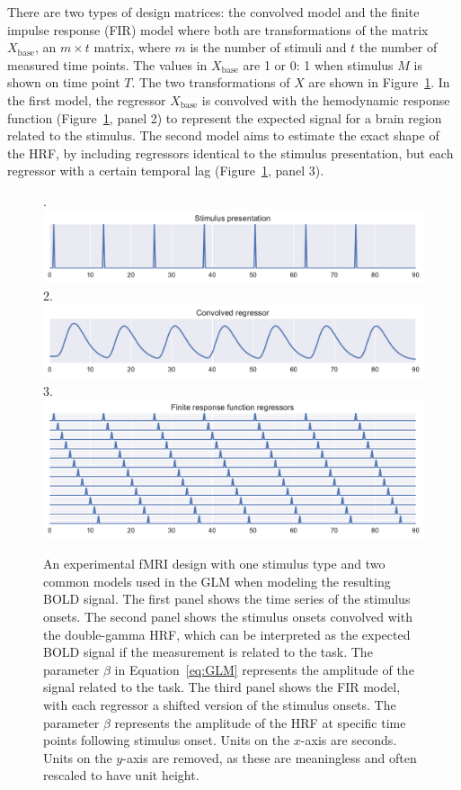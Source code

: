 \documentclass[article]{jss}
\begin{document}
There are two types of design matrices: the convolved model and the
finite impulse response (FIR) model where both are transformations of
the matrix $X_\text{base}$, an $m \times t$ matrix, where $m$ is the
number of stimuli and $t$ the number of measured time points.  The
values in $X_\text{base}$ are 1 or 0: 1 when stimulus $M$ is shown on
time point $T$.  The two transformations of $X$ are shown in
Figure~\ref{fig1}.  In the first model, the regressor $X_\text{base}$
is convolved with the hemodynamic response function (Figure~\ref{fig1},
panel 2) to represent the expected signal for a brain region related
to the stimulus.  The second model aims to estimate the exact shape of
the HRF, by including regressors identical to the stimulus
presentation, but each regressor with a certain temporal lag
(Figure~\ref{fig1}, panel 3).
%
\begin{figure}[t!]
. \\
\includegraphics[scale=2]{Figure1a.pdf} \\
2. \\
\includegraphics[scale=2]{Figure1b.pdf} \\
3. \\
\includegraphics[scale=2]{Figure1c.pdf}
\caption{An experimental fMRI design with one stimulus type and two
  common models used in the GLM when modeling the resulting BOLD
  signal.  The first panel shows the time series of the stimulus
  onsets.  The second panel shows the stimulus onsets convolved with
  the double-gamma HRF, which can be interpreted as the expected BOLD
  signal if the measurement is related to the task.  The parameter
  $\beta$ in Equation~\ref{eq:GLM} represents the amplitude of the
  signal related to the task. The third panel shows the FIR model,
  with each regressor a shifted version of the stimulus onsets.  The
  parameter $\beta$ represents the amplitude of the HRF at specific
  time points following stimulus onset.  Units on the $x$-axis are
  seconds.  Units on the $y$-axis are removed, as these are
  meaningless and often rescaled to have unit height.\label{fig1}}
\end{figure}
\end{document}
